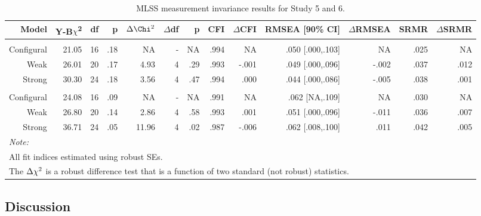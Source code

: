\documentclass[
  12pt,
  a4paper,
]{book}
\begin{document}
\begin{landscape}\begin{table}

\caption{\label{tab:efficacy-mi}MLSS measurement invariance results for Study 5 and 6.}
\centering
\begin{tabular}[t]{rrrrrrrrrrrrr}
\toprule
Model & Y-B$\chi$\textsuperscript{2} & df & p & $\Delta\Chi\textsuperscript{2}$ & $\Delta$df & p & CFI & $\Delta$CFI & RMSEA [90\% CI] & $\Delta$RMSEA & SRMR & $\Delta$SRMR\\
\midrule
\addlinespace[0.3em]
\multicolumn{13}{l}{\textbf{Study 5}}\\
\hspace{1em}Configural & 21.05 & 16 & .18 & NA & - & NA & .994 & NA & .050 [.000,.103] & NA & .025 & NA\\
\hspace{1em}Weak & 26.01 & 20 & .17 & 4.93 & 4 & .29 & .993 & -.001 & .049 [.000,.096] & -.002 & .037 & .012\\
\hspace{1em}Strong & 30.30 & 24 & .18 & 3.56 & 4 & .47 & .994 & .000 & .044 [.000,.086] & -.005 & .038 & .001\\
\addlinespace[0.3em]
\multicolumn{13}{l}{\textbf{Study 6}}\\
\hspace{1em}Configural & 24.08 & 16 & .09 & NA & - & NA & .991 & NA & .062 [NA,.109] & NA & .030 & NA\\
\hspace{1em}Weak & 26.80 & 20 & .14 & 2.86 & 4 & .58 & .993 & .001 & .051 [.000,.096] & -.011 & .036 & .007\\
\hspace{1em}Strong & 36.71 & 24 & .05 & 11.96 & 4 & .02 & .987 & -.006 & .062 [.008,.100] & .011 & .042 & .005\\
\bottomrule
\multicolumn{13}{l}{\textit{Note: }}\\
\multicolumn{13}{l}{All fit indices estimated using robust SEs.}\\
\multicolumn{13}{l}{The $\Delta\chi\textsuperscript{2}$ is a robust difference test that is a function of two standard (not robust) statistics.}\\
\end{tabular}
\end{table}
\end{landscape}

\hypertarget{study-5-discussion}{%
\subsection{Discussion}\label{study-5-discussion}}
\end{document}
